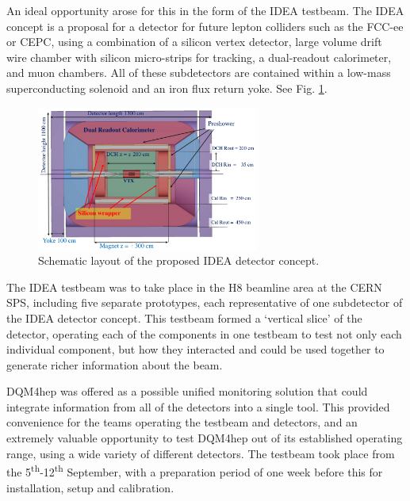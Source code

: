 An ideal opportunity arose for this in the form of the \acrshort{IDEA} testbeam. The \acrshort{IDEA} concept is a proposal for a detector for future lepton colliders such as the \acrshort{FCC}-ee or \acrshort{CEPC}, using a combination of a silicon vertex detector, large volume drift wire chamber with silicon micro-strips for tracking, a dual-readout calorimeter, and muon chambers. All of these subdetectors are contained within a low-mass superconducting solenoid and an iron flux return yoke. See Fig. \ref{figure:idea/detector-concept}.

\begin{figure}[h]
	\centering
	\includegraphics[width=0.65\textwidth]{../Pictures/IDEA/IDEA-concept.png}
	\caption{Schematic layout of the proposed \acrshort{IDEA} detector concept.}
	\label{figure:idea/detector-concept}
\end{figure}

The \acrshort{IDEA} testbeam was to take place in the H8 beamline area at the \acrshort{CERN} \acrshort{SPS}, including five separate prototypes, each representative of one subdetector of the \acrshort{IDEA} detector concept. This testbeam formed a `vertical slice' of the detector, operating each of the components in one testbeam to test not only each individual component, but how they interacted and could be used together to generate richer information about the beam.

\acrshort{DQM4hep} was offered as a possible unified monitoring solution that could integrate information from all of the detectors into a single tool. This provided convenience for the teams operating the testbeam and detectors, and an extremely valuable opportunity to test \acrshort{DQM4hep} out of its established operating range, using a wide variety of different detectors. The testbeam took place from the 5\textsuperscript{th}-12\textsuperscript{th} September, with a preparation period of one week before this for installation, setup and calibration.

